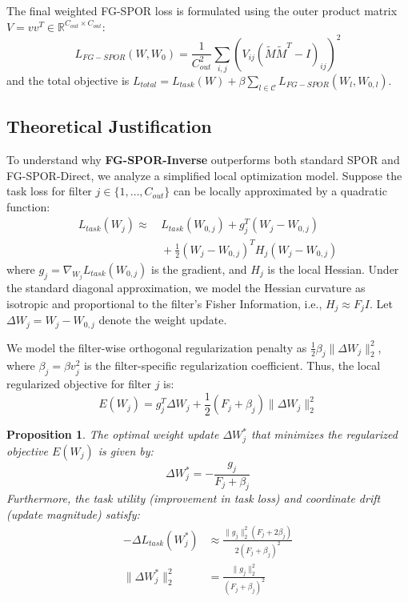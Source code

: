 \documentclass{article}
\theoremstyle{plain}
\newtheorem{proposition}[theorem]{Proposition}
\theoremstyle{definition}
\theoremstyle{remark}
\begin{document}
The final weighted FG-SPOR loss is formulated using the outer product matrix $V = v v^T \in \mathbb{R}^{C_{out} \times C_{out}}$:
\begin{equation}
    L_{FG-SPOR}(W, W_0) = \frac{1}{C_{out}^2} \sum_{i,j} \left( V_{ij} (\tilde{M}\tilde{M}^T - I)_{ij} \right)^2
\end{equation}
and the total objective is $L_{total} = L_{task}(W) + \beta \sum_{l \in \mathcal{C}} L_{FG-SPOR}(W_l, W_{0,l})$.

\subsection{Theoretical Justification}
To understand why \textbf{FG-SPOR-Inverse} outperforms both standard SPOR and FG-SPOR-Direct, we analyze a simplified local optimization model. Suppose the task loss for filter $j \in \{1, \dots, C_{out}\}$ can be locally approximated by a quadratic function:
\begin{align}
    L_{task}(W_j) \approx&\, L_{task}(W_{0,j}) + g_j^T (W_j - W_{0,j}) \nonumber \\
    &\,+ \frac{1}{2} (W_j - W_{0,j})^T H_j (W_j - W_{0,j})
\end{align}
where $g_j = \nabla_{W_j} L_{task}(W_{0,j})$ is the gradient, and $H_j$ is the local Hessian. Under the standard diagonal approximation, we model the Hessian curvature as isotropic and proportional to the filter's Fisher Information, i.e., $H_j \approx F_j I$. Let $\Delta W_j = W_j - W_{0,j}$ denote the weight update.

We model the filter-wise orthogonal regularization penalty as $\frac{1}{2} \beta_j \|\Delta W_j\|_2^2$, where $\beta_j = \beta v_j^2$ is the filter-specific regularization coefficient. Thus, the local regularized objective for filter $j$ is:
\begin{equation}
    E(W_j) = g_j^T \Delta W_j + \frac{1}{2} (F_j + \beta_j) \|\Delta W_j\|_2^2
\end{equation}

\begin{proposition}
The optimal weight update $\Delta W_j^*$ that minimizes the regularized objective $E(W_j)$ is given by:
\begin{equation}
    \Delta W_j^* = -\frac{g_j}{F_j + \beta_j}
\end{equation}
Furthermore, the task utility (improvement in task loss) and coordinate drift (update magnitude) satisfy:
\begin{align}
    -\Delta L_{task}(W_j^*) &\approx \frac{\|g_j\|_2^2 (F_j + 2 \beta_j)}{2 (F_j + \beta_j)^2} \\
    \|\Delta W_j^*\|_2^2 &= \frac{\|g_j\|_2^2}{(F_j + \beta_j)^2}
\end{align}
\end{proposition}
\end{document}
